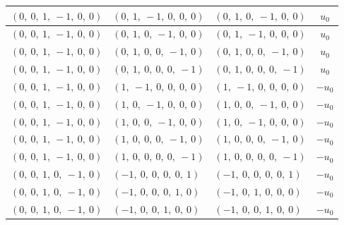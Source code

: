 \documentclass[11pt]{article}
\theoremstyle{definition}
\begin{document}
\begin{longtable}{|l|l|l|c|}
    \hline
    $\left( 0, \  0, \  1, \  -1, \  0, \  0\right)$ & $\left( 0, \  1, \  -1, \  0, \  0, \  0\right)$ & $\left( 0, \  1, \  0, \  -1, \  0, \  0\right)$ & $u_{0}$ \\
    \hline
    $\left( 0, \  0, \  1, \  -1, \  0, \  0\right)$ & $\left( 0, \  1, \  0, \  -1, \  0, \  0\right)$ & $\left( 0, \  1, \  -1, \  0, \  0, \  0\right)$ & $u_{0}$ \\
    \hline
    $\left( 0, \  0, \  1, \  -1, \  0, \  0\right)$ & $\left( 0, \  1, \  0, \  0, \  -1, \  0\right)$ & $\left( 0, \  1, \  0, \  0, \  -1, \  0\right)$ & $u_{0}$ \\
    \hline
    $\left( 0, \  0, \  1, \  -1, \  0, \  0\right)$ & $\left( 0, \  1, \  0, \  0, \  0, \  -1\right)$ & $\left( 0, \  1, \  0, \  0, \  0, \  -1\right)$ & $u_{0}$ \\
    \hline
    $\left( 0, \  0, \  1, \  -1, \  0, \  0\right)$ & $\left( 1, \  -1, \  0, \  0, \  0, \  0\right)$ & $\left( 1, \  -1, \  0, \  0, \  0, \  0\right)$ & $- u_{0}$ \\
    \hline
    $\left( 0, \  0, \  1, \  -1, \  0, \  0\right)$ & $\left( 1, \  0, \  -1, \  0, \  0, \  0\right)$ & $\left( 1, \  0, \  0, \  -1, \  0, \  0\right)$ & $- u_{0}$ \\
    \hline
    $\left( 0, \  0, \  1, \  -1, \  0, \  0\right)$ & $\left( 1, \  0, \  0, \  -1, \  0, \  0\right)$ & $\left( 1, \  0, \  -1, \  0, \  0, \  0\right)$ & $- u_{0}$ \\
    \hline
    $\left( 0, \  0, \  1, \  -1, \  0, \  0\right)$ & $\left( 1, \  0, \  0, \  0, \  -1, \  0\right)$ & $\left( 1, \  0, \  0, \  0, \  -1, \  0\right)$ & $- u_{0}$ \\
    \hline
    $\left( 0, \  0, \  1, \  -1, \  0, \  0\right)$ & $\left( 1, \  0, \  0, \  0, \  0, \  -1\right)$ & $\left( 1, \  0, \  0, \  0, \  0, \  -1\right)$ & $- u_{0}$ \\
    \hline
    $\left( 0, \  0, \  1, \  0, \  -1, \  0\right)$ & $\left( -1, \  0, \  0, \  0, \  0, \  1\right)$ & $\left( -1, \  0, \  0, \  0, \  0, \  1\right)$ & $- u_{0}$ \\
    \hline
    $\left( 0, \  0, \  1, \  0, \  -1, \  0\right)$ & $\left( -1, \  0, \  0, \  0, \  1, \  0\right)$ & $\left( -1, \  0, \  1, \  0, \  0, \  0\right)$ & $- u_{0}$ \\
    \hline
    $\left( 0, \  0, \  1, \  0, \  -1, \  0\right)$ & $\left( -1, \  0, \  0, \  1, \  0, \  0\right)$ & $\left( -1, \  0, \  0, \  1, \  0, \  0\right)$ & $- u_{0}$ \\

\end{longtable}
\end{document}
